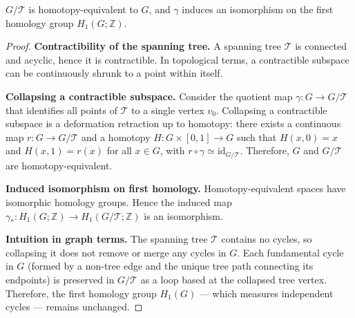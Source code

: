 
\begin{proposition}
\label{prop.homotopy}
$G/\mathcal{T}$ is homotopy-equivalent to $G$, and $\gamma$ induces an isomorphism on the first homology group $H_1(G;\mathbb{Z})$.
\end{proposition}
\begin{proof}
\textbf{Contractibility of the spanning tree.}  
A spanning tree $\mathcal{T}$ is connected and acyclic, hence it is contractible. 
In topological terms, a contractible subspace can be continuously shrunk to a point within itself.

\textbf{Collapsing a contractible subspace.}  
Consider the quotient map $\gamma: G \to G/\mathcal{T}$ that identifies all points of $\mathcal{T}$ to a single vertex $v_0$.  
Collapsing a contractible subspace is a deformation retraction up to homotopy: there exists a continuous map 
$r: G \to G/\mathcal{T}$ and a homotopy 
$H: G \times [0,1] \to G$ such that $H(x,0) = x$ and $H(x,1) = r(x)$ for all $x \in G$, with $r \circ \gamma \simeq \mathrm{id}_{G/\mathcal{T}}$.  
Therefore, $G$ and $G/\mathcal{T}$ are homotopy-equivalent.

\textbf{Induced isomorphism on first homology.}  
Homotopy-equivalent spaces have isomorphic homology groups.  
Hence the induced map 
$\gamma_*: H_1(G;\mathbb{Z}) \to H_1(G/\mathcal{T};\mathbb{Z})$ 
is an isomorphism.

\textbf{Intuition in graph terms.}  
The spanning tree $\mathcal{T}$ contains no cycles, so collapsing it does not remove or merge any cycles in $G$.  
Each fundamental cycle in $G$ (formed by a non-tree edge and the unique tree path connecting its endpoints) is preserved in $G/\mathcal{T}$ as a loop based at the collapsed tree vertex.  
Therefore, the first homology group $H_1(G)$ — which measures independent cycles — remains unchanged.
\end{proof}








